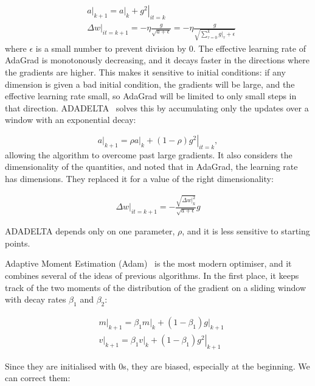 \begin{align*}
&\left.a\right|_{k+1} = \left. a\right|_{k} + \left.g^2\right|_{it=k}\\
&\left.\Delta w\right|_{it=k+1} = - \eta\frac{g}{\sqrt{a + \epsilon}} =  - \eta\frac{g}{\sqrt{\sum_{\tau=0}^{k} \left.g\right|_\tau + \epsilon}}
\end{align*}
where $\epsilon$ is a small number to prevent division by 0.
The effective learning rate of AdaGrad is monotonously decreasing, and it decays faster in the directions where the gradients are higher.
This makes it sensitive to initial conditions: if any dimension is given a bad initial condition, the gradients will be large, and the effective learning rate small, so AdaGrad will be limited to only small steps in that direction.
ADADELTA~\citep{adadelta} solves this by accumulating only the updates over a window with an exponential decay:

\begin{equation*}
\left.a\right|_{k+1} = \rho \left. a\right|_{k} + (1-\rho) \left.g^2\right|_{it=k},
\end{equation*}
allowing the algorithm to overcome past large gradients.
It also considers the dimensionality of the quantities, and noted that in AdaGrad, the learning rate has dimensions.
They replaced it for a value of the right dimensionality:

\begin{align*}
\left.\Delta w\right|_{it=k+1} = - \frac{\sqrt{\left.\Delta w\right|_{k}^2}}{\sqrt{a + \epsilon}}g 
\end{align*}

ADADELTA depends only on one parameter, $\rho$, and it is less sensitive to starting points.

Adaptive Moment Estimation (Adam)~\citep{adam}
is the most modern optimiser, and it combines several of the ideas of previous algorithms.
In the first place, it keeps track of the two moments of the distribution of the gradient on a sliding window with decay rates $\beta_1$ and $\beta_2$:

\begin{align*}
&\left.m\right|_{k+1} = \beta_1 \left.m\right|_k + (1-\beta_1) \left.g\right|_{k+1}\\
&\left.v\right|_{k+1} = \beta_1 \left.v\right|_k + (1-\beta_1) \left.g^2\right|_{k+1}
\end{align*}

Since they are initialised with 0s, they are biased, especially at the beginning. We can correct them:

